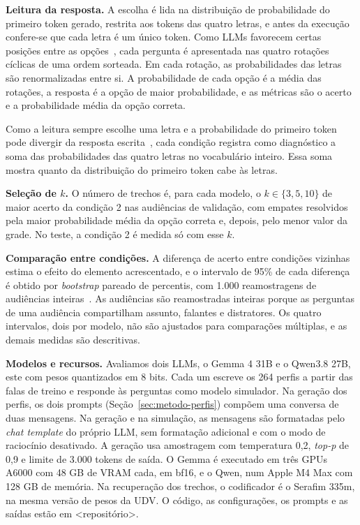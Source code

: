 \textbf{Leitura da resposta.} A escolha é lida na distribuição de probabilidade do primeiro token
gerado, restrita aos tokens das quatro letras, e antes da execução confere-se que cada letra é um
único token. Como LLMs favorecem certas posições entre as
opções~\citep{zheng2024large,pezeshkpour2024large}, cada pergunta é apresentada nas quatro rotações
cíclicas de uma ordem sorteada. Em cada rotação, as probabilidades das letras são renormalizadas
entre si. A probabilidade de cada opção é a
média das rotações, a resposta é a opção de maior probabilidade, e as métricas são o acerto e a
probabilidade média da opção correta.

Como a leitura sempre escolhe uma letra e a probabilidade do primeiro token pode divergir da
resposta escrita~\citep{wang2024answer}, cada condição registra como diagnóstico a soma das
probabilidades das quatro letras no vocabulário inteiro. Essa soma mostra quanto da distribuição do
primeiro token cabe às letras.

\textbf{Seleção de $k$.} O número de trechos é, para cada modelo, o $k \in \{3, 5, 10\}$ de maior
acerto da condição 2 nas audiências de validação, com empates resolvidos pela maior probabilidade média da opção correta
e, depois, pelo menor valor da grade. No teste, a condição 2 é medida só com esse $k$.

\textbf{Comparação entre condições.} A diferença de acerto entre condições vizinhas estima o efeito
do elemento acrescentado, e o intervalo de 95\% de cada diferença é obtido por \textit{bootstrap}
pareado de percentis, com 1.000 reamostragens de audiências inteiras~\citep{efron1993introduction}.
As audiências são reamostradas inteiras porque as perguntas de uma audiência compartilham assunto,
falantes e distratores. Os quatro intervalos, dois por modelo, não são ajustados para comparações
múltiplas, e as demais medidas são descritivas.

\textbf{Modelos e recursos.} Avaliamos dois LLMs, o Gemma 4 31B e o Qwen3.8 27B, este com pesos
quantizados em 8 bits. Cada um escreve os 264 perfis a partir das falas de treino e responde às
perguntas como modelo simulador. Na geração dos perfis, os dois prompts
(Seção~\ref{sec:metodo-perfis}) compõem uma conversa de duas mensagens. Na geração e na simulação, as
mensagens são formatadas pelo \textit{chat template} do próprio LLM, sem formatação adicional e com o
modo de raciocínio desativado. A geração usa amostragem com temperatura 0,2, \textit{top-p} de 0,9 e
limite de 3.000 tokens de saída. O Gemma é executado em três GPUs A6000 com 48 GB de VRAM cada, em
bf16, e o Qwen, num Apple M4 Max com 128 GB de memória. Na recuperação dos trechos, o codificador é o
Serafim 335m, na mesma versão de pesos da UDV. O código, as configurações, os prompts e as saídas
estão em <repositório>.
